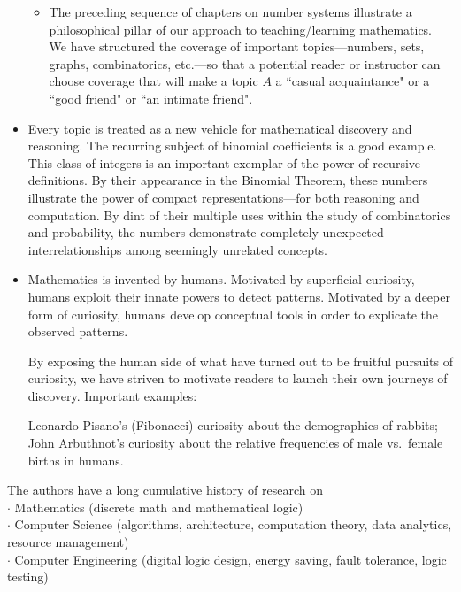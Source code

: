 \documentclass{article}[12pt]
\begin{document}
\begin{itemize}
\begin{itemize}
\item
The preceding sequence of chapters on number systems illustrate a philosophical pillar of our approach to teaching/learning mathematics.  We have structured the coverage of important topics---numbers, sets, graphs, combinatorics, etc.---so that a potential reader or instructor can choose coverage that will make a topic $A$ a ``casual acquaintance" or a ``good friend" or ``an intimate friend".
\end{itemize}

\item
Every topic is treated as a new vehicle for mathematical discovery and reasoning.  The recurring subject of binomial coefficients is a good example.  This class of integers is an important exemplar of the power of recursive definitions.  By their appearance in the Binomial Theorem, these numbers illustrate the power of compact representations---for both reasoning and computation.  By dint of their multiple uses within the study of combinatorics and probability, the numbers demonstrate completely unexpected interrelationships among seemingly unrelated concepts.

\item
Mathematics is invented by humans.  Motivated by superficial curiosity, humans exploit their innate powers to detect patterns.  Motivated by a deeper form of curiosity, humans develop conceptual tools in order to explicate the observed patterns.

\smallskip

By exposing the human side of what have turned out to be fruitful pursuits of curiosity, we have striven to motivate readers to launch their own journeys of discovery.  Important examples:

Leonardo Pisano's (Fibonacci) curiosity about the demographics of rabbits; John Arbuthnot's curiosity about the relative frequencies of male vs.~female births in humans. 
\end{itemize}

\bigskip


\medskip

\noindent
The authors have a long cumulative history of research on \\
$\cdot$ Mathematics (discrete math and mathematical logic) \\
$\cdot$ Computer Science (algorithms, architecture, computation theory, data analytics, resource management) \\
$\cdot$ Computer Engineering (digital logic design, energy saving, fault tolerance, logic testing)
\end{document}
